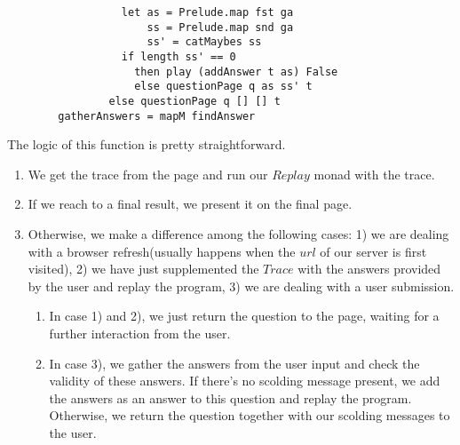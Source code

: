 \documentclass[10pt]{article}
\begin{document}
\begin{lstlisting}
                  let as = Prelude.map fst ga                                                                                                                                                 
                      ss = Prelude.map snd ga                                                                                                                                                 
                      ss' = catMaybes ss                                                                                                                                                      
                  if length ss' == 0                                                                                                                                                          
                    then play (addAnswer t as) False                                                                                                                                          
                    else questionPage q as ss' t                                                                                                                                              
                else questionPage q [] [] t                                                                                                                                                   
        gatherAnswers = mapM findAnswer
\end{lstlisting}
The logic of this function is pretty straightforward.
\begin{enumerate}
\item We get the trace from the page and run our $Replay$ monad with the trace.
\item If we reach to a final result, we present it on the final page.
\item Otherwise, we make a difference among the following cases: 1) we are dealing with a browser refresh(usually happens when the $url$ of our server is first visited), 2) we have just supplemented the $Trace$ with the answers provided by the user and replay the program, 3) we are dealing with a user submission.
\begin{enumerate}
\item In case 1) and 2), we just return the question to the page, waiting for a further interaction from the user.
\item In case 3), we gather the answers from the user input and check the validity of these answers. If there's no scolding message present, we add the answers as an answer to this question and replay the program. Otherwise, we return the question together with our scolding messages to the user.
\end{enumerate}
\end{enumerate}
\end{document}
